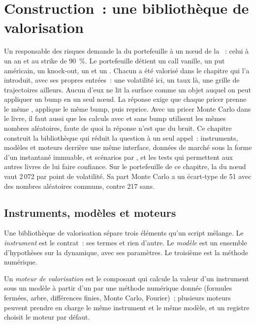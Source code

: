 \chapter{Construction~: une bibliothèque de valorisation}\label{ch:dv:build-a-pricing-library}

Un responsable des risques demande la  du portefeuille à un nœud de la ~: celui à un an et au strike de 90~\%. Le portefeuille détient un call vanille, un
put américain, un knock-out, un  et un . Chacun a été valorisé dans le chapitre qui l'a introduit, avec ses propres entrées~: une volatilité
ici, un taux là, une grille de trajectoires ailleurs. Aucun d'eux ne lit la surface comme un objet auquel on peut appliquer un bump en un seul nœud. La réponse exige que chaque
pricer prenne le même , applique le même bump, puis reprice. Avec un pricer Monte Carlo dans le livre, il faut aussi que les calculs avec et sans bump
utilisent les mêmes nombres aléatoires, faute de quoi la réponse n'est que du bruit. Ce chapitre construit la bibliothèque qui réduit la question à un seul appel~: instruments,
modèles et moteurs derrière une même interface, données de marché sous la forme d'un instantané immuable,  et scénarios par , et les tests qui permettent
aux autres livres de lui faire confiance. Sur le portefeuille de ce chapitre, la  du nœud vaut 2\,072 par point de volatilité. Sa part Monte Carlo a un écart-type de 51 avec
des nombres aléatoires communs, contre 217 sans.

\section{Instruments, modèles et moteurs}

Une bibliothèque de valorisation sépare trois éléments qu'un script mélange. Le \emph{instrument} est le contrat~: ses termes et rien d'autre. Le \emph{modèle} est un
ensemble d'hypothèses sur la dynamique, avec ses paramètres. Le troisième est la méthode numérique.

\begin{definition}\label{def:dv:build-a-pricing-library:engine}
Un \emph{moteur de valorisation} est le composant qui calcule la valeur d'un instrument sous un modèle à partir d'un  par une
méthode numérique donnée (formules fermées, arbre, différences finies, Monte Carlo, Fourier)~; plusieurs moteurs peuvent prendre en charge le même instrument et le même modèle, et un
registre choisit le moteur par défaut.
\end{definition}

